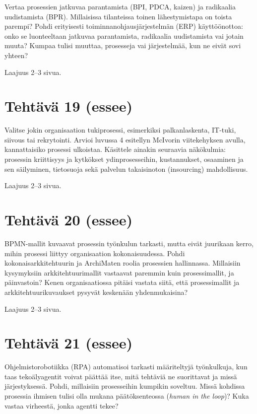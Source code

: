 \documentclass[
  finnish,
  letterpaper,
  DIV=11,
  numbers=noendperiod,
  oneside]{scrreprt}
\begin{document}
Vertaa prosessien jatkuvaa parantamista (BPI, PDCA, kaizen) ja
radikaalia uudistamista (BPR). Millaisissa tilanteissa toinen
lähestymistapa on toista parempi? Pohdi erityisesti
toiminnanohjausjärjestelmän (ERP) käyttöönottoa: onko se luonteeltaan
jatkuvaa parantamista, radikaalia uudistamista vai jotain muuta? Kumpaa
tulisi muuttaa, prosesseja vai järjestelmää, kun ne eivät sovi yhteen?

Laajuus 2--3 sivua.

\section{Tehtävä 19 (essee)}\label{tehtuxe4vuxe4-19-essee}

Valitse jokin organisaation tukiprosessi, esimerkiksi palkanlaskenta,
IT-tuki, siivous tai rekrytointi. Arvioi luvussa 4 esitellyn McIvorin
viitekehyksen avulla, kannattaisiko prosessi ulkoistaa. Käsittele
ainakin seuraavia näkökulmia: prosessin kriittisyys ja kytkökset
ydinprosesseihin, kustannukset, osaaminen ja sen säilyminen, tietosuoja
sekä palvelun takaisinoton (insourcing) mahdollisuus.

Laajuus 2--3 sivua.

\section{Tehtävä 20 (essee)}\label{tehtuxe4vuxe4-20-essee}

BPMN-mallit kuvaavat prosessin työnkulun tarkasti, mutta eivät juurikaan
kerro, mihin prosessi liittyy organisaation kokonaisuudessa. Pohdi
kokonaisarkkitehtuurin ja ArchiMaten roolia prosessien hallinnassa.
Millaisiin kysymyksiin arkkitehtuurimallit vastaavat paremmin kuin
prosessimallit, ja päinvastoin? Kenen organisaatiossa pitäisi vastata
siitä, että prosessimallit ja arkkitehtuurikuvaukset pysyvät keskenään
yhdenmukaisina?

Laajuus 2--3 sivua.

\section{Tehtävä 21 (essee)}\label{tehtuxe4vuxe4-21-essee}

Ohjelmistorobotiikka (RPA) automatisoi tarkasti määriteltyjä
työnkulkuja, kun taas tekoälyagentit voivat päättää itse, mitä tehtäviä
ne suorittavat ja missä järjestyksessä. Pohdi, millaisiin prosesseihin
kumpikin soveltuu. Missä kohdissa prosessia ihmisen tulisi olla mukana
päätöksenteossa (\emph{human in the loop})? Kuka vastaa virheestä, jonka
agentti tekee?
\end{document}
